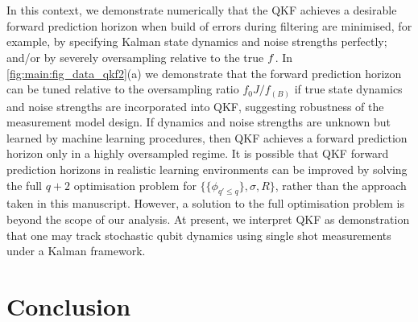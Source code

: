 \\
\\
In this context, we demonstrate numerically that the QKF achieves a desirable forward prediction horizon when build of errors during filtering are minimised, for example, by specifying Kalman state dynamics and noise strengths perfectly; and/or by severely oversampling relative to the true $f$.   In \cref{fig:main:fig_data_qkf2}(a) we demonstrate that the forward prediction horizon can be tuned relative to the oversampling ratio $f_0J / f_{(B)}$ if true state dynamics and noise strengths are incorporated into QKF, suggesting robustness of the measurement model design.  If dynamics and noise strengths are unknown but learned by machine learning procedures, then QKF achieves a forward prediction horizon only in a highly oversampled regime. It is possible that QKF forward prediction horizons in realistic learning environments can be improved by solving the full $q+2$ optimisation problem for $\{\{ \phi_{q' \leq q}\}, \sigma, R\}$, rather than the approach taken in this manuscript. However, a solution to the full optimisation problem is beyond the scope of our analysis. At present, we interpret QKF as demonstration that one may track stochastic qubit dynamics using single shot measurements under a Kalman framework.

\section{Conclusion \label{sec:main:Conclusion}}

